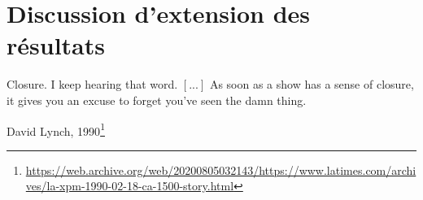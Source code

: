 
\clearemptydoublepage
\chapter{Discussion d'extension des résultats}
\label{chap:discussion}

\hfill\parbox[t]{.7\textwidth}{
    \footnotesize\globalfootnotestrue
    Closure. I keep hearing that word. $[...]$ As soon as a show has a sense of closure, it gives you an excuse to forget you've seen the damn thing.
    \begin{flushright}
        David Lynch, 1990\footnote{\tiny\url{https://web.archive.org/web/20200805032143/https://www.latimes.com/archives/la-xpm-1990-02-18-ca-1500-story.html}}
    \end{flushright}%
}
\vspace*{24pt}
\copyinserts


